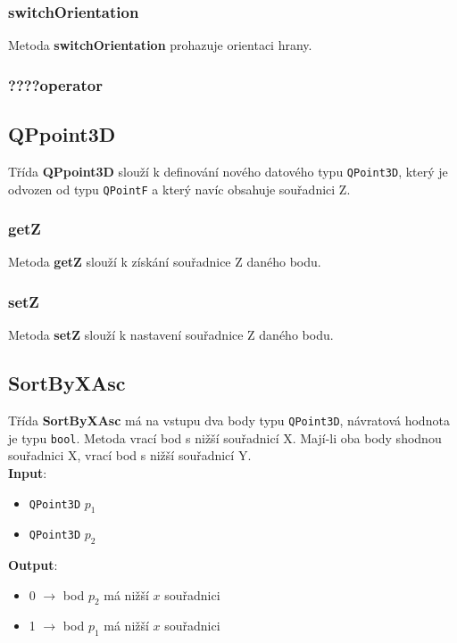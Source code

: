 \documentclass[a4paper, 12pt]{article}
\begin{document}
\subsubsection*{switchOrientation}
Metoda \textbf{switchOrientation} prohazuje orientaci hrany.  

\subsubsection*{????operator}


\subsection{QPpoint3D}
Třída \textbf{QPpoint3D} slouží k definování nového datového typu \texttt{QPoint3D}, který je odvozen od typu \texttt{QPointF} a který navíc obsahuje souřadnici Z.

\subsubsection*{getZ}
Metoda \textbf{getZ} slouží k získání souřadnice Z daného bodu.

\subsubsection*{setZ}
Metoda \textbf{setZ} slouží k nastavení souřadnice Z daného bodu. 


\subsection{SortByXAsc}
Třída \textbf{SortByXAsc} má na vstupu dva body typu \texttt{QPoint3D}, návratová hodnota je typu \texttt{bool}. Metoda vrací bod s nižší  souřadnicí X. Mají-li oba body shodnou souřadnici X, vrací bod s nižší souřadnicí Y.\\

\textbf{Input}:
\begin{itemize}
\item \texttt{QPoint3D} $p_1$
\item \texttt{QPoint3D} $p_2$
\end{itemize}

\textbf{Output}:
\begin{itemize}
\item 0 $\rightarrow$ bod $p_2$ má nižší $x$ souřadnici
\item 1 $\rightarrow$ bod $p_1$ má nižší $x$ souřadnici
\end{itemize}
\end{document}
